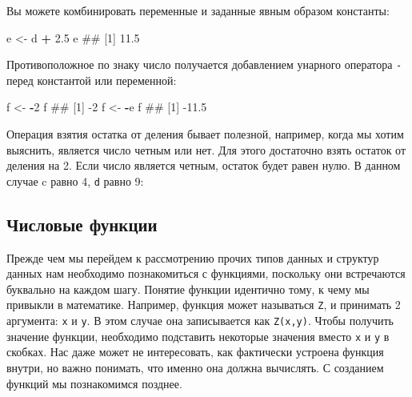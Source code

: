 \documentclass[]{book}
\newenvironment{Shaded}{\begin{snugshade}}{\end{snugshade}}
\newcommand{\DecValTok}[1]{\textcolor[rgb]{0.00,0.00,0.81}{#1}}
\newcommand{\FloatTok}[1]{\textcolor[rgb]{0.00,0.00,0.81}{#1}}
\newcommand{\StringTok}[1]{\textcolor[rgb]{0.31,0.60,0.02}{#1}}
\newcommand{\OperatorTok}[1]{\textcolor[rgb]{0.81,0.36,0.00}{\textbf{#1}}}
\newcommand{\NormalTok}[1]{#1}
\begin{document}
Вы можете комбинировать переменные и заданные явным образом константы:

\begin{Shaded}
\begin{Highlighting}[]
\NormalTok{e <-}\StringTok{ }\NormalTok{d }\OperatorTok{+}\StringTok{ }\FloatTok{2.5}
\NormalTok{e}
\NormalTok{## [1] 11.5}
\end{Highlighting}
\end{Shaded}

Противоположное по знаку число получается добавлением унарного оператора
\texttt{-} перед константой или переменной:

\begin{Shaded}
\begin{Highlighting}[]
\NormalTok{f <-}\StringTok{ }\OperatorTok{-}\DecValTok{2}
\NormalTok{f}
\NormalTok{## [1] -2}
\NormalTok{f <-}\StringTok{ }\OperatorTok{-}\NormalTok{e}
\NormalTok{f}
\NormalTok{## [1] -11.5}
\end{Highlighting}
\end{Shaded}

Операция взятия остатка от деления бывает полезной, например, когда мы
хотим выяснить, является число четным или нет. Для этого достаточно
взять остаток от деления на 2. Если число является четным, остаток будет
равен нулю. В данном случае c равно 4, \texttt{d} равно 9:

\begin{Shaded}
\end{Shaded}

\subsection{Числовые функции}\label{number_functions}

Прежде чем мы перейдем к рассмотрению прочих типов данных и структур
данных нам необходимо познакомиться с функциями, поскольку они
встречаются буквально на каждом шагу. Понятие функции идентично тому, к
чему мы привыкли в математике. Например, функция может называться
\texttt{Z}, и принимать 2 аргумента: \texttt{x} и \texttt{y}. В этом
случае она записывается как \texttt{Z(x,y)}. Чтобы получить значение
функции, необходимо подставить некоторые значения вместо \texttt{x} и
\texttt{y} в скобках. Нас даже может не интересовать, как фактически
устроена функция внутри, но важно понимать, что именно она должна
вычислять. С созданием функций мы познакомимся позднее.
\end{document}
